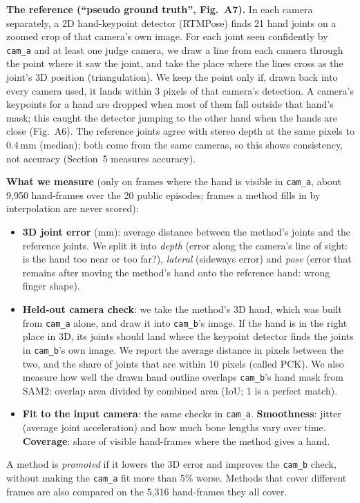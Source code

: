 \documentclass[10pt]{article}
\begin{document}
\textbf{The reference (``pseudo ground truth'', Fig.~A7).} In each camera separately, a 2D hand-keypoint detector
(RTMPose) finds 21 hand joints on a zoomed crop of that camera's own image. For each joint seen confidently by
\texttt{cam\_a} and at least one judge camera, we draw a line from each camera through the point where it saw the joint,
and take the place where the lines cross as the joint's 3D position (triangulation). We keep the point only if, drawn back
into every camera used, it lands within 3 pixels of that camera's detection. A camera's keypoints for a hand are dropped
when most of them fall outside that hand's mask; this caught the detector jumping to the other hand when the hands are
close (Fig.~A6). The reference joints agree with stereo depth at the same pixels to 0.4\,mm (median); both come from the
same cameras, so this shows consistency, not accuracy (Section~5 measures accuracy).

\textbf{What we measure} (only on frames where the hand is visible in \texttt{cam\_a}, about 9{,}950 hand-frames over
the 20 public episodes; frames a method fills in by interpolation are never scored):
\begin{itemize}
\item \textbf{3D joint error} (mm): average distance between the method's joints and the reference joints. We split it
into \emph{depth} (error along the camera's line of sight: is the hand too near or too far?), \emph{lateral} (sideways
error) and \emph{pose} (error that remains after moving the method's hand onto the reference hand: wrong finger shape).
\item \textbf{Held-out camera check}: we take the method's 3D hand, which was built from \texttt{cam\_a} alone, and draw it
into \texttt{cam\_b}'s image. If the hand is in the right place in 3D, its joints should land where the keypoint detector
finds the joints in \texttt{cam\_b}'s own image. We report the average distance in pixels between the two, and the share
of joints that are within 10 pixels (called PCK). We also measure how well the drawn hand outline overlaps \texttt{cam\_b}'s
hand mask from SAM2: overlap area divided by combined area (IoU; 1 is a perfect match).
\item \textbf{Fit to the input camera}: the same checks in \texttt{cam\_a}. \textbf{Smoothness}: jitter (average joint
acceleration) and how much bone lengths vary over time. \textbf{Coverage}: share of visible hand-frames where the method
gives a hand.
\end{itemize}
A method is \emph{promoted} if it lowers the 3D error and improves the \texttt{cam\_b} check, without making the
\texttt{cam\_a} fit more than 5\% worse. Methods that cover different frames are also compared on the 5{,}316 hand-frames
they all cover.
\end{document}
